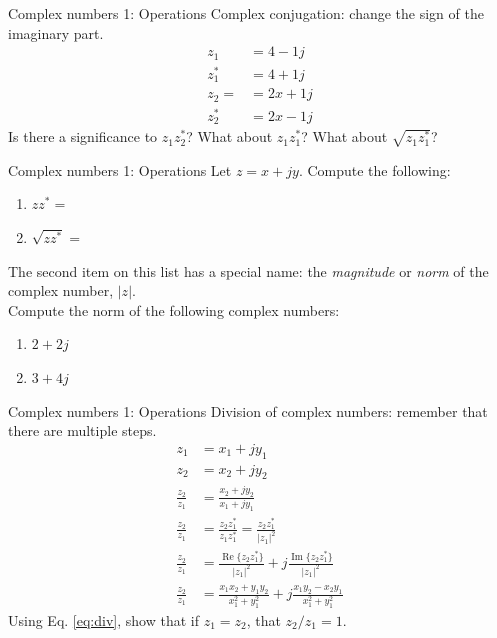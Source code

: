 \documentclass{beamer}
\begin{document}
\begin{frame}{Complex numbers 1: Operations}
Complex conjugation: change the sign of the imaginary part.
\begin{align}
z_1 &= 4-1j \\
z_1^* &= 4+1j \\
z_2 = &= 2x + 1j \\
z_2^* &= 2x - 1j
\end{align}
Is there a significance to $z_1 z_2^*$?  What about $z_1 z_1^*$?  What about $\sqrt{z_1 z_1^*}$?
\end{frame}

\begin{frame}{Complex numbers 1: Operations}
Let $z = x+jy$.  Compute the following:
\begin{enumerate}
\item $zz^* = $
\item $\sqrt{zz^*} = $
\end{enumerate}
The second item on this list has a special name: the \textit{magnitude} or \textit{norm} of the complex number, $|z|$. \\ \vspace{0.5cm}
Compute the norm of the following complex numbers:
\begin{enumerate}
\item $2+2j$
\item $3+4j$
\end{enumerate}
\end{frame}

\begin{frame}{Complex numbers 1: Operations}
Division of complex numbers: remember that there are multiple steps.
\begin{align}
z_1 &= x_1 + j y_1 \\
z_2 &= x_2 + j y_2 \\
\frac{z_2}{z_1} &= \frac{x_2 + j y_2}{x_1 + j y_1} \\
\frac{z_2}{z_1} &= \frac{z_2 z_1^*}{z_1z_1^*} = \frac{z_2 z_1^*}{|z_1|^2} \\
\frac{z_2}{z_1} &= \frac{\operatorname{Re} \lbrace{z_2 z_1^*}\rbrace}{|z_1|^2} + j \frac{\operatorname{Im} \lbrace{z_2 z_1^*}\rbrace}{|z_1|^2} \\
\frac{z_2}{z_1} &= \frac{x_1 x_2 + y_1 y_2}{x_1^2 + y_1^2} + j \frac{x_1 y_2 - x_2 y_1}{x_1^2 + y_1^2} \label{eq:div}
\end{align}
Using Eq. \ref{eq:div}, show that if $z_1 = z_2$, that $z_2/z_1 = 1$.
\end{frame}
\end{document}

